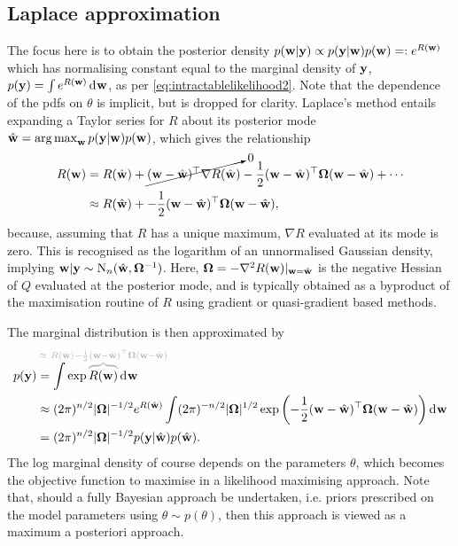\subsection{Laplace approximation}


The focus here is to obtain the posterior density $p({\mathbf w}|{\mathbf y}) \propto p({\mathbf y}|{\mathbf w})p({\mathbf w}) =: e^{R({\mathbf w})}$ which has normalising constant equal to the marginal density of ${\mathbf y}$, $p({\mathbf y}) = \int e^{R({\mathbf w})} \operatorname{d}\hspace{0.5pt}\! {\mathbf w}$, as per \cref{eq:intractablelikelihood2}.
Note that the dependence of the pdfs on $\theta$ is implicit, but is dropped for clarity.
Laplace's method \citep[§4.1.1, pp. 777--778]{kass1995bayes} entails expanding a Taylor series for $R$ about its posterior mode $\hat{{\mathbf w}} = \operatorname*{arg\,max}_{\mathbf w} p({\mathbf y}|{\mathbf w})p({\mathbf w})$, which gives the relationship
\begin{align*}
  R({\mathbf w}) 
  &= R(\hat{{\mathbf w}}) + 
  \cancelto{0}{({\mathbf w} - \hat{{\mathbf w}})^\top \nabla R(\hat{{\mathbf w}})} 
  - \frac{1}{2} ({\mathbf w} - \hat{{\mathbf w}})^\top {\bm\Omega} ({\mathbf w} - \hat{{\mathbf w}}) + \cdots \\
  &\approx R(\hat{{\mathbf w}}) + 
  - \frac{1}{2} ({\mathbf w} - \hat{{\mathbf w}})^\top {\bm\Omega} ({\mathbf w} - \hat{{\mathbf w}}),
\end{align*}
because, assuming that $R$ has a unique maximum, $\nabla R$ evaluated at its mode is zero.
This is recognised as the logarithm of an unnormalised Gaussian density, implying ${\mathbf w}|{\mathbf y} \sim \operatorname{N}_n(\hat{{\mathbf w}},{\bm\Omega}^{-1})$.
Here, ${\bm\Omega} = -\nabla^2 R({\mathbf w})|_{{\mathbf w}=\hat{{\mathbf w}}}$ is the negative Hessian of $Q$ evaluated at the posterior mode, and is typically obtained as a byproduct of the maximisation routine of $R$ using gradient or quasi-gradient based methods.

The marginal distribution is then approximated by
\begin{align*}
  p(\by) 
  &= \int \exp
  \greyoverbrace{R(\bw)}{\hidewidth \approx \ R(\hat\bw) - \half (\bw - \hat\bw)^\top \bOmega (\bw - \hat\bw)\hidewidth}
   \dint \bw \\
  &\approx (2\pi)^{n/2} \abs{\bOmega}^{-1/2} e^{R(\hat\bw)} 
  \int (2\pi)^{-n/2} \abs{\bOmega}^{1/2} \exp \left(- \half (\bw - \hat\bw)^\top \bOmega (\bw - \hat\bw) \right) \dint\bw \\
  &= (2\pi)^{n/2} \abs{\bOmega}^{-1/2} p(\by|\hat\bw)p(\hat\bw).
\end{align*} 
The log marginal density of course depends on the parameters $\theta$, which becomes the objective function to maximise in a likelihood maximising approach.
Note that, should a fully Bayesian approach be undertaken, i.e. priors prescribed on the model parameters using $\theta \sim p(\theta)$, then this approach is viewed as a maximum a posteriori approach.

